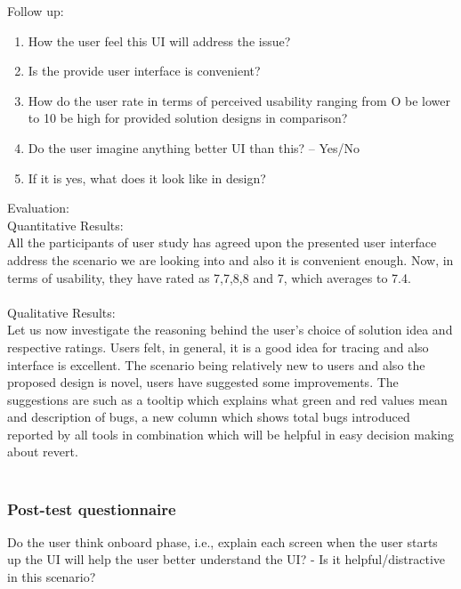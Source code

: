 Follow up: \\

\begin{enumerate}
\item How the user feel this UI will address the issue?  
\item Is the provide user interface is convenient?
\item How do the user rate in terms of perceived usability ranging from O be lower to 10 be high for provided solution designs in comparison?
\item Do the user imagine anything better UI than this? – Yes/No
\item If it is yes, what does it look like in design?
\end{enumerate}

Evaluation: \\

Quantitative Results: \\

All the participants of user study has agreed upon the presented user interface address the scenario we are looking into and also it is convenient enough. Now, in terms of usability, they have rated as 7,7,8,8 and 7, which averages to 7.4.  \\ \\

Qualitative Results: \\

Let us now investigate the reasoning behind the user’s choice of solution idea and respective ratings. Users felt, in general, it is a good idea for tracing and also interface is excellent. The scenario being relatively new to users and also the proposed design is novel, users have suggested some improvements.  The suggestions are such as a tooltip which explains what green and red values mean and description of bugs, a new column which shows total bugs introduced reported by all tools in combination which will be helpful in easy decision making about revert. \\ \\

\subsubsection{Post-test questionnaire}

Do the user think onboard phase, i.e., explain each screen when the user starts up the UI will help the user better understand the UI? - Is it helpful/distractive in this scenario? \\

